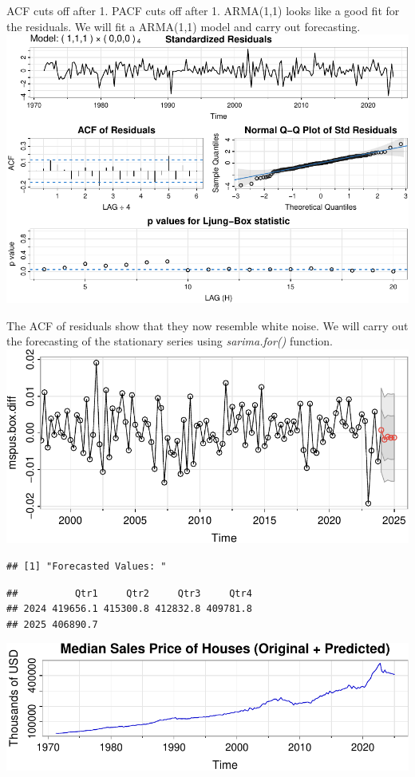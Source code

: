 \documentclass[
  man]{apa6}
\begin{document}
ACF cuts off after 1. PACF cuts off after 1. ARMA(1,1) looks like a good fit for the residuals. We will fit a ARMA(1,1) model and carry out forecasting.
\includegraphics{STAT429Report_files/figure-latex/unnamed-chunk-14-1.pdf}

The ACF of residuals show that they now resemble white noise. We will carry out the forecasting of the stationary series using \emph{sarima.for()} function.
\includegraphics{STAT429Report_files/figure-latex/unnamed-chunk-15-1.pdf}

\begin{verbatim}
## [1] "Forecasted Values: "
\end{verbatim}

\begin{verbatim}
##          Qtr1     Qtr2     Qtr3     Qtr4
## 2024 419656.1 415300.8 412832.8 409781.8
## 2025 406890.7
\end{verbatim}

\includegraphics{STAT429Report_files/figure-latex/unnamed-chunk-16-1.pdf}
\end{document}
